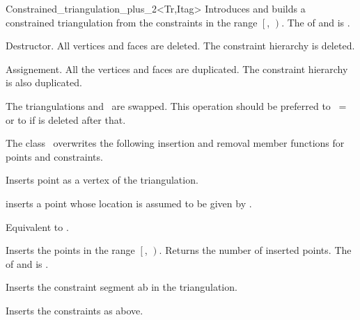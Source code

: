 \begin{ccRefClass}{Constrained_triangulation_plus_2<Tr,Itag>}
{Introduces and builds a constrained triangulation 
from the constraints in the range
$\left[\right.$, $\left.\right)$.
\ccPrecond The  of  and 
 is .
}

{Destructor. All vertices and faces are deleted.
The constraint hierarchy is deleted.}




{Assignement. All the vertices and faces are duplicated.
 The constraint hierarchy is also duplicated.}

{The triangulations  and \ccVar\ are swapped.
This operation should be preferred to \ccVar\ =  or to
 if  is deleted after that.}

The class \ccRefName\ overwrites the following insertion and removal
member functions for points and constraints.

{Inserts point  as a vertex of the triangulation.}

{inserts a point  whose location is assumed 
to be given by .}

{Equivalent to .}

{Inserts the points in the range
 $\left[\right.$, $\left.\right)$.
 Returns the number of inserted points.
 \ccPrecond The  of  and 
 is .}

{Inserts the constraint segment ab in the triangulation. }

{Inserts the constraints  as above.}


\end{ccRefClass}

